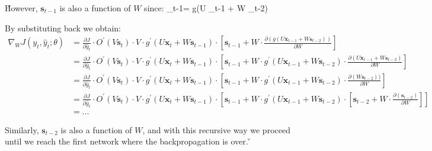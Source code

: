 \v

However, $\boldsymbol{s}_{t-1}$ is also a function of $W$ since:
\bse
{}_{t-1}= g(U _{t-1} + W _{t-2})
\ese

By substituting back we obtain:
{\setlength{\jot}{5pt}
\begin{align*}
\nabla_W J(y_t, \hat{y}_t ; \theta) & = \frac{\partial J}{\partial \hat{y}_t} \cdot O^\prime(V \boldsymbol{s}_{t})
\cdot V \cdot g^\prime(U \boldsymbol{x}_{t} + W \boldsymbol{s}_{t-1}) \cdot \left[ \boldsymbol{s}_{t-1} + W
\cdot \frac{\partial (g(U \boldsymbol{x}_{t-1} + W \boldsymbol{s}_{t-2}))} {\partial W} \right] \\
& = \frac{\partial J}{\partial \hat{y}_t} \cdot O^\prime(V\boldsymbol{s}_{t})
\cdot V \cdot g^\prime(U\boldsymbol{x}_{t} + W \boldsymbol{s}_{t-1})
\cdot \left[\boldsymbol{s}_{t-1} + W \cdot g^\prime (U\boldsymbol{x}_{t-1} + W \boldsymbol{s}_{t-2})
\cdot \frac{\partial (U\boldsymbol{x}_{t-1} + W \boldsymbol{s}_{t-2})} {\partial W} \right] \\
&= \frac{\partial J}{\partial \hat{y}_t} \cdot O^\prime(V\boldsymbol{s}_{t}) \cdot V
\cdot g^\prime(U\boldsymbol{x}_{t} + W \boldsymbol{s}_{t-1}) \cdot \left[\boldsymbol{s}_{t-1} + W \cdot g^\prime
(U \boldsymbol{x}_{t-1} + W \boldsymbol{s}_{t-2}) \cdot \frac{\partial (W \boldsymbol{s}_{t-2}))} {\partial W} \right]
\\
&= \frac{\partial J}{\partial \hat{y}_t} \cdot O^\prime(V \boldsymbol{s}_{t}) \cdot V
\cdot g^\prime(U \boldsymbol{x}_{t} + W \boldsymbol{s}_{t-1}) \cdot \left[\boldsymbol{s}_{t-1} + W \cdot g^\prime
(U \boldsymbol{x}_{t-1} + W \boldsymbol{s}_{t-2}) \cdot \left[\boldsymbol{s}_{t-2} + W
\cdot \frac{\partial(\boldsymbol{s}_{t-2})} {\partial W} \right] \right] \\ &= \ldots
\end{align*}}

Similarly, $\boldsymbol{s}_{t-2}$ is also a function of $W$, and with this recursive way we proceed until we reach the
first network where the backpropagation is over. \v

